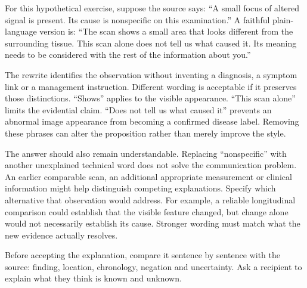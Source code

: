 \biomedicalanswer
{}
For this hypothetical exercise, suppose the source says: ``A small focus of altered signal is present. Its cause is nonspecific on this examination.'' A faithful plain-language version is: ``The scan shows a small area that looks different from the surrounding tissue. This scan alone does not tell us what caused it. Its meaning needs to be considered with the rest of the information about you.''

The rewrite identifies the observation without inventing a diagnosis, a symptom link or a management instruction. Different wording is acceptable if it preserves those distinctions.
``Shows'' applies to the visible appearance. ``This scan alone'' limits the evidential claim. ``Does not tell us what caused it'' prevents an abnormal image appearance from becoming a confirmed disease label. Removing these phrases can alter the proposition rather than merely improve the style.

The answer should also remain understandable. Replacing ``nonspecific'' with another unexplained technical word does not solve the communication problem.
An earlier comparable scan, an additional appropriate measurement or clinical information might help distinguish competing explanations. Specify which alternative that observation would address. For example, a reliable longitudinal comparison could establish that the visible feature changed, but change alone would not necessarily establish its cause. Stronger wording must match what the new evidence actually resolves.

Before accepting the explanation, compare it sentence by sentence with the source: finding, location, chronology, negation and uncertainty. Ask a recipient to explain what they think is known and unknown.

